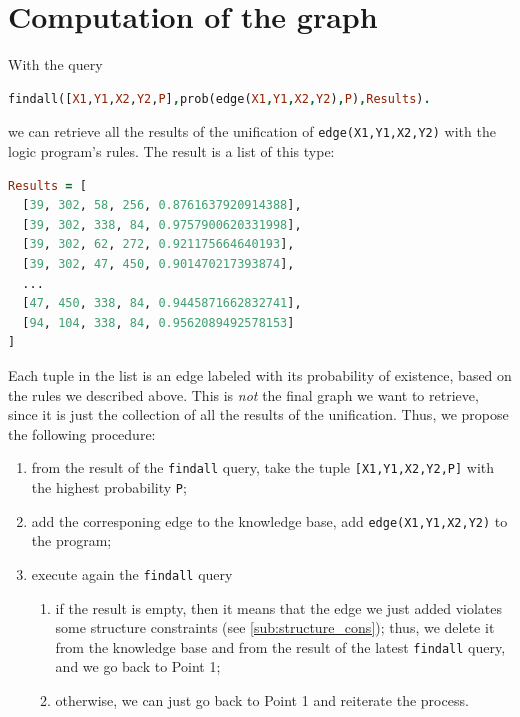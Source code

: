 \documentclass[8pt]{article}
\begin{document}
\section{Computation of the graph}
With the query 
  \begin{center}
  \begin{lstlisting}[language=Prolog,frame = single,basicstyle=\footnotesize\ttfamily]
findall([X1,Y1,X2,Y2,P],prob(edge(X1,Y1,X2,Y2),P),Results).
  \end{lstlisting}
  \end{center}
we can retrieve all the results of the unification of \texttt{edge(X1,Y1,X2,Y2)}
with the logic program's rules. The result is a list of this type:
  \begin{center}
  \begin{lstlisting}[language=Prolog,frame = single,basicstyle=\footnotesize\ttfamily]
Results = [
  [39, 302, 58, 256, 0.8761637920914388],
  [39, 302, 338, 84, 0.9757900620331998],
  [39, 302, 62, 272, 0.921175664640193],
  [39, 302, 47, 450, 0.901470217393874],
  ...
  [47, 450, 338, 84, 0.9445871662832741],
  [94, 104, 338, 84, 0.9562089492578153]
]
  \end{lstlisting}
  \end{center}
Each tuple in the list is an edge labeled with its probability of existence,
based on the rules we described above. This is \emph{not} the final graph
we want to retrieve, since it is just the collection of all the results
of the unification. Thus, we propose the following procedure:
  \begin{enumerate}
    \item
      from the result of the \texttt{findall} query, take the tuple
      \texttt{[X1,Y1,X2,Y2,P]} with the highest probability \texttt{P};
    \item
      add the corresponing edge to the knowledge base, \ie
      add \texttt{edge(X1,Y1,X2,Y2)} to the program;
    \item
      execute again the \texttt{findall} query
      \begin{enumerate}
        \item
          if the result is empty, then it means that the edge we just
          added violates some structure constraints (see
          \cref{sub:structure_cons}); thus, we delete it from the knowledge
          base and from the result of the latest \texttt{findall} query, and we
          go back to Point 1; 
        \item
          otherwise, we can just go back to Point 1 and reiterate the process.
      \end{enumerate}
  \end{enumerate}
\end{document}

